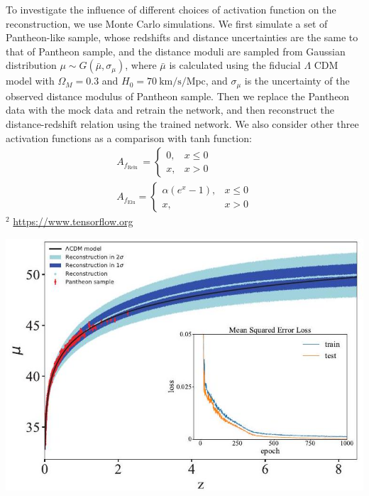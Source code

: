 \documentclass[10pt, a4paper]{article}
\begin{document}
To investigate the influence of different choices of activation function on the reconstruction, we use Monte Carlo simulations. We first simulate a set of Pantheon-like sample, whose redshifts and distance uncertainties are the same to that of Pantheon sample, and the distance moduli are sampled from Gaussian distribution $\mu \sim G\left(\bar{\mu}, \sigma_{\mu}\right)$, where $\bar{\mu}$ is calculated using the fiducial $\Lambda$ CDM model with $\Omega_{M}=0.3$ and $H_{0}=70 \mathrm{~km} / \mathrm{s} / \mathrm{Mpc}$, and $\sigma_{\mu}$ is the uncertainty of the observed distance modulus of Pantheon sample. Then we replace the Pantheon data with the mock data and retrain the network, and then reconstruct the distance-redshift relation using the trained network. We also consider other three activation functions as a comparison with tanh function:
$$
\begin{gathered}
A_{f_{\text {Relu }}}= \begin{cases}0, & x \leq 0 \\
x, & x>0\end{cases} \\
A_{f_{\mathrm{Elu}}}= \begin{cases}\alpha\left(e^{x}-1\right), & x \leq 0 \\
x, & x>0\end{cases}
\end{gathered}
$$
${ }^{2}$ \href{https://www.tensorflow.org}{https://www.tensorflow.org}

\includegraphics[max width=\textwidth]{2022_04_27_cf6124939ea404970a21g-05}
\end{document}
